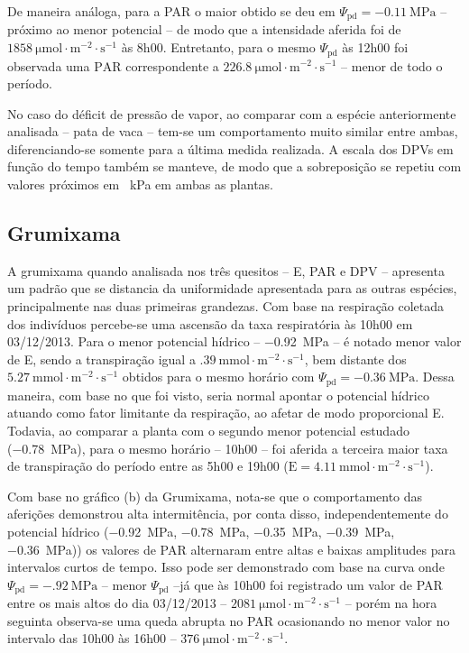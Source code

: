 \documentclass[a4paper, 12pt]{article}
\numberwithin{equation}{section}
\begin{document}
	De maneira análoga, para a PAR o maior obtido se deu em $\Psi_{\textrm{pd}}=\SI{-0.11}{\mega\pascal}$ -- próximo ao menor potencial -- de modo que a intensidade aferida foi de $\SI{1858}{\micro\mole\cdot\meter^{-2}\cdot\second^{-1}}$ às 8h00. Entretanto, para o mesmo $\Psi_{\textrm{pd}}$ às 12h00 foi observada uma $\textrm{PAR}$ correspondente a $\SI{226.8}{\micro\mole\cdot\meter^{-2}\cdot\second^{-1}}$ -- menor de todo o período.	
	
	No caso do déficit de pressão de vapor, ao comparar com a espécie anteriormente analisada -- pata de vaca -- tem-se um comportamento muito similar entre ambas, diferenciando-se somente para a última medida realizada. A escala dos DPVs em função do tempo também se manteve, de modo que a sobreposição se repetiu com valores próximos em \SI{}{\kilo\pascal} em ambas as plantas.
	
	\subsection{Grumixama}
	
	A grumixama quando analisada nos três quesitos -- E, PAR e DPV -- apresenta um padrão que se distancia da uniformidade apresentada para as outras espécies, principalmente nas duas primeiras grandezas. Com base na respiração coletada dos indivíduos percebe-se uma ascensão da taxa respiratória às 10h00 em 03/12/2013. Para o menor potencial hídrico -- \SI{-.92}{\mega\pascal} -- é notado menor valor de E, sendo a transpiração igual a $\SI{.39}{\milli\mole\cdot\meter^{-2}\cdot\second^{-1}}$, bem distante dos $\SI{5.27}{\milli\mole\cdot\meter^{-2}\cdot\second^{-1}}$ obtidos para o mesmo horário com $\Psi_{\textrm{pd}}=\SI{-0.36}{\mega\pascal}$. Dessa maneira, com base no que foi visto, seria normal apontar o potencial hídrico atuando como fator limitante da respiração, ao afetar de modo proporcional E. Todavia, ao comparar a planta com o segundo menor potencial estudado (\SI{-.78}{\mega\pascal}), para o mesmo horário -- 10h00 -- foi aferida a terceira maior taxa de transpiração do período entre as 5h00 e 19h00 ($\textrm{E}=\SI{4.11}{\milli\mole\cdot\meter^{-2}\cdot\second^{-1}}$).
	
	Com base no gráfico (b) da Grumixama, nota-se que o comportamento das aferições demonstrou alta intermitência, por conta disso, independentemente do potencial hídrico (\SI{-.92}{\mega\pascal}, \SI{-.78}{\mega\pascal}, \SI{-.35}{\mega\pascal}, \SI{-.39}{\mega\pascal}, \SI{-.36}{\mega\pascal})) os valores de PAR alternaram entre altas e baixas amplitudes para intervalos curtos de tempo. Isso pode ser demonstrado com base na curva onde $\Psi_{\textrm{pd}}=\SI{-.92}{\mega\pascal}$ -- menor $\Psi_{\textrm{pd}}$ --já que às 10h00 foi registrado um valor de PAR entre os mais altos do dia 03/12/2013 -- $\SI{2081}{\micro\mole\cdot\meter^{-2}\cdot\second^{-1}}$ -- porém na hora seguinta observa-se uma queda abrupta no PAR ocasionando no menor valor no intervalo das 10h00 às 16h00 -- $\SI{376}{\micro\mole\cdot\meter^{-2}\cdot\second^{-1}}$. 
	
\end{document}
